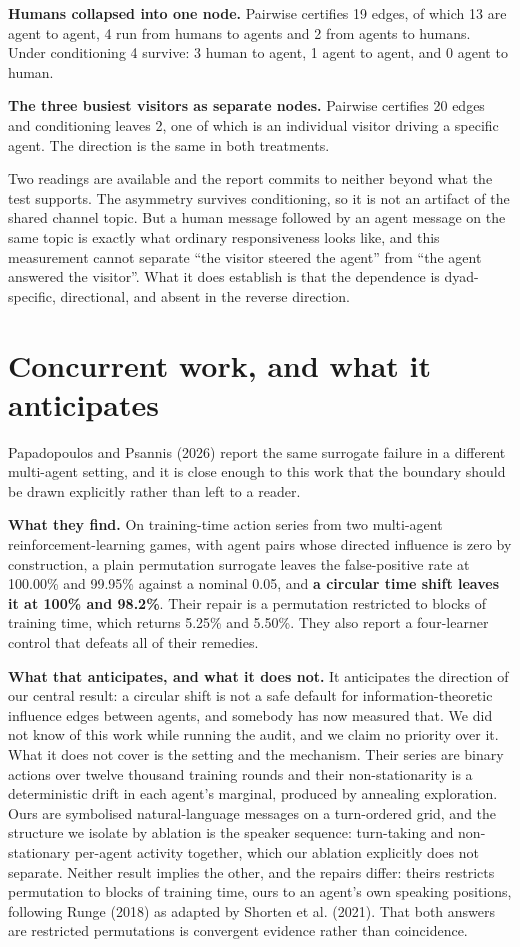 \documentclass[11pt]{article}
\begin{document}
\textbf{Humans collapsed into one node.} Pairwise certifies 19 edges, of which 13 are agent to agent, 4 run from humans to agents and 2 from agents to humans. Under conditioning 4 survive: 3 human to agent, 1 agent to agent, and 0 agent to human.

\textbf{The three busiest visitors as separate nodes.} Pairwise certifies 20 edges and conditioning leaves 2, one of which is an individual visitor driving a specific agent. The direction is the same in both treatments.

Two readings are available and the report commits to neither beyond what the test supports. The asymmetry survives conditioning, so it is not an artifact of the shared channel topic. But a human message followed by an agent message on the same topic is exactly what ordinary responsiveness looks like, and this measurement cannot separate ``the visitor steered the agent'' from ``the agent answered the visitor''. What it does establish is that the dependence is dyad-specific, directional, and absent in the reverse direction.

\section{Concurrent work, and what it anticipates}

Papadopoulos and Psannis (2026) report the same surrogate failure in a different multi-agent setting, and it is close enough to this work that the boundary should be drawn explicitly rather than left to a reader.

\textbf{What they find.} On training-time action series from two multi-agent reinforcement-learning games, with agent pairs whose directed influence is zero by construction, a plain permutation surrogate leaves the false-positive rate at 100.00\% and 99.95\% against a nominal 0.05, and \textbf{a circular time shift leaves it at 100\% and 98.2\%}. Their repair is a permutation restricted to blocks of training time, which returns 5.25\% and 5.50\%. They also report a four-learner control that defeats all of their remedies.

\textbf{What that anticipates, and what it does not.} It anticipates the direction of our central result: a circular shift is not a safe default for information-theoretic influence edges between agents, and somebody has now measured that. We did not know of this work while running the audit, and we claim no priority over it. What it does not cover is the setting and the mechanism. Their series are binary actions over twelve thousand training rounds and their non-stationarity is a deterministic drift in each agent's marginal, produced by annealing exploration. Ours are symbolised natural-language messages on a turn-ordered grid, and the structure we isolate by ablation is the speaker sequence: turn-taking and non-stationary per-agent activity together, which our ablation explicitly does not separate. Neither result implies the other, and the repairs differ: theirs restricts permutation to blocks of training time, ours to an agent's own speaking positions, following Runge (2018) as adapted by Shorten et al. (2021). That both answers are restricted permutations is convergent evidence rather than coincidence.
\end{document}
